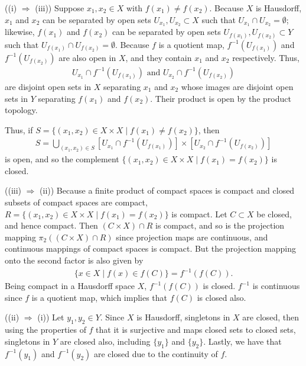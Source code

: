 \documentclass[a4paper,12pt]{article}
\begin{document}
\begin{enumerate}
        ((i) $\Rightarrow$ (iii)) Suppose $x_1, x_2 \in X$ with $f(x_1) \neq f(x_2)$. Because $X$ is Hausdorff, $x_1$ and $x_2$ can be separated by open sets $U_{x_1}, U_{x_2} \subset X$ such that $U_{x_1} \cap U_{x_2} = \emptyset$; likewise, $f(x_1)$ and $f(x_2)$ can be separated by open sets $U_{f(x_1)}, U_{f(x_2)} \subset Y$ such that $U_{f(x_1)} \cap U_{f(x_2)} = \emptyset$. Because $f$ is a quotient map, $f^{-1}(U_{f(x_1)})$ and $f^{-1}(U_{f(x_2)})$ are also open in $X$, and they contain $x_1$ and $x_2$ respectively. Thus,
        \begin{align*}
            U_{x_1} \cap f^{-1}(U_{f(x_1)}) \text{ and } U_{x_2} \cap f^{-1}(U_{f(x_2)})
        \end{align*}
        are disjoint open sets in $X$ separating $x_1$ and $x_2$ whose images are disjoint open sets in $Y$ separating $f(x_1)$ and $f(x_2)$. Their product is open by the product topology. \par
        Thus, if $S = \{ (x_1, x_2) \in X \times X \mid f(x_1) \neq f(x_2) \}$, then
        \begin{align*}
            S = \bigcup_{(x_1, x_2) \in S} [U_{x_1} \cap f^{-1}(U_{f(x_1)})] \times [U_{x_2} \cap f^{-1}(U_{f(x_2)})]
        \end{align*}
        is open, and so the complement $\{ (x_1, x_2) \in X \times X \mid f(x_1) = f(x_2) \}$ is closed. \par
        ((iii) $\Rightarrow$ (ii)) Because a finite product of compact spaces is compact and closed subsets of compact spaces are compact, $R = \{ (x_1, x_2) \in X \times X \mid f(x_1) = f(x_2) \}$ is compact. Let $C \subset X$ be closed, and hence compact. Then $(C \times X) \cap R$ is compact, and so is the projection mapping $\pi_2((C \times X) \cap R)$ since projection maps are continuous, and continuous mappings of compact spaces is compact. But the projection mapping onto the second factor is also given by
        \begin{align*}
            \{ x \in X \mid f(x) \in f(C) \} = f^{-1}(f(C)).
        \end{align*}
        Being compact in a Hausdorff space $X$, $f^{-1}(f(C))$ is closed. $f^{-1}$ is continuous since $f$ is a quotient map, which implies that $f(C)$ is closed also. \par
        ((ii) $\Rightarrow$ (i)) Let $y_1, y_2 \in Y$. Since $X$ is Hausdorff, singletons in $X$ are closed, then using the properties of $f$ that it is surjective and maps closed sets to closed sets, singletons in $Y$ are closed also, including $\{y_1\}$ and $\{y_2\}$. Lastly, we have that $f^{-1}(y_1)$ and $f^{-1}(y_2)$ are closed due to the continuity of $f$. \par

\end{enumerate}
\end{document}

